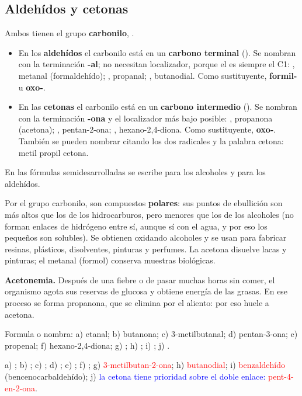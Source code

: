 \subsection{Aldehídos y cetonas}

Ambos tienen el grupo \textbf{carbonilo}, .
\begin{itemize}
    \item En los \textbf{aldehídos} el carbonilo está en un \textbf{carbono terminal} (). Se nombran con la terminación
    \textbf{-al}; no necesitan localizador, porque el  es siempre el C1: , metanal (formaldehído);
    , propanal; , butanodial. Como sustituyente, \textbf{formil-} u \textbf{oxo-}.
    \item En las \textbf{cetonas} el carbonilo está en un \textbf{carbono intermedio} (). Se nombran con la terminación
    \textbf{-ona} y el localizador más bajo posible: , propanona (acetona); , pentan-2-ona;
    , hexano-2,4-diona. Como sustituyente, \textbf{oxo-}. También se pueden nombrar citando los dos
    radicales y la palabra cetona: metil propil cetona.
\end{itemize}
En las fórmulas semidesarrolladas se escribe  para los alcoholes y  para los aldehídos.

Por el grupo carbonilo, son compuestos \textbf{polares}: sus puntos de ebullición son más altos que los de los hidrocarburos, pero
menores que los de los alcoholes (no forman enlaces de hidrógeno entre sí, aunque sí con el agua, y por eso los pequeños son
solubles). Se obtienen oxidando alcoholes y se usan para fabricar resinas, plásticos, disolventes, pinturas y perfumes. La acetona
disuelve lacas y pinturas; el metanal (formol) conserva muestras biológicas.

\begin{remark}
    \textbf{Acetonemia.} Después de una fiebre o de pasar muchas horas sin comer, el organismo agota sus reservas de glucosa y
    obtiene energía de las grasas. En ese proceso se forma propanona, que se elimina por el aliento: por eso huele a acetona.
\end{remark}

\begin{exercise}
    Formula o nombra: a) etanal; b) butanona; c) 3-metilbutanal; d) pentan-3-ona; e) propenal; f) hexano-2,4-diona;
    g) ; h) ; i) ; j) .
    \begin{solu}
        a) \textcolor{red}{}; b) \textcolor{red}{}; c) \textcolor{red}{};
        d) \textcolor{red}{}; e) \textcolor{red}{}; f) \textcolor{red}{};
        g) \textcolor{red}{3-metilbutan-2-ona}; h) \textcolor{red}{butanodial}; i) \textcolor{red}{benzaldehído}
        (bencenocarbaldehído); j) \textcolor{blue}{la cetona tiene prioridad sobre el doble enlace:} \textcolor{red}{pent-4-en-2-ona}.
    \end{solu}
\end{exercise}

